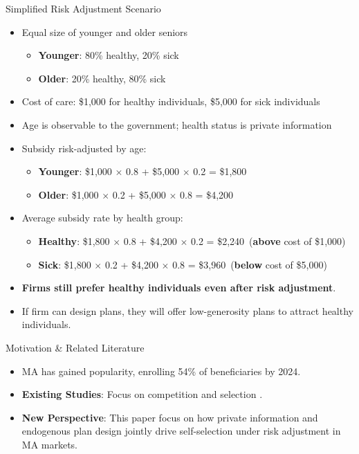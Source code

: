 \documentclass[professionalfonts, aspectratio=169]{beamer}
\begin{document}
\begin{frame}{Simplified Risk Adjustment Scenario}
  \begin{itemize}
    \item Equal size of younger and older seniors
    \begin{itemize}
      \item \textbf{Younger}: 80\% healthy, 20\% sick
      \item \textbf{Older}: 20\% healthy, 80\% sick
    \end{itemize}
    \item Cost of care: \$1,000 for healthy individuals, \$5,000 for sick individuals
    \item Age is observable to the government; health status is private information \pause
    \item Subsidy risk-adjusted by age:
    \begin{itemize}
      \item \textbf{Younger}: \$1,000 $\times$ 0.8 + \$5,000 $\times$ 0.2 = \$1,800
      \item \textbf{Older}: \$1,000 $\times$ 0.2 + \$5,000 $\times$ 0.8 = \$4,200
    \end{itemize}
    \item Average subsidy rate by health group:
    \begin{itemize}
      \item \textbf{Healthy}: \$1,800 $\times$ 0.8 + \$4,200 $\times$ 0.2 = \$2,240\ (\textbf{above} cost of \$1,000)
      \item \textbf{Sick}: \$1,800 $\times$ 0.2 + \$4,200 $\times$ 0.8 = \$3,960\ (\textbf{below} cost of \$5,000)
    \end{itemize}
    \item \textbf{Firms still prefer healthy individuals even after risk adjustment}.
    \item If firm can design plans, they will offer low-generosity plans to attract healthy individuals.
  \end{itemize}
\end{frame}

\begin{frame}{Motivation \& Related Literature}
  \begin{itemize}
    \item MA has gained popularity, enrolling 54\% of beneficiaries by 2024.
    \item \textbf{Existing Studies}: Focus on competition \citep{curtoCanHealthInsurance2021,millerOptimalGeographicDistribution2023} and selection \citep{aizawaAdvertisingRiskSelection2018,brownHowDoesRisk2014}.
  \item \textbf{New Perspective}: This paper focus on how private information and endogenous plan design jointly drive self-selection under risk adjustment in MA markets.
  \end{itemize}
\end{frame}
\end{document}
